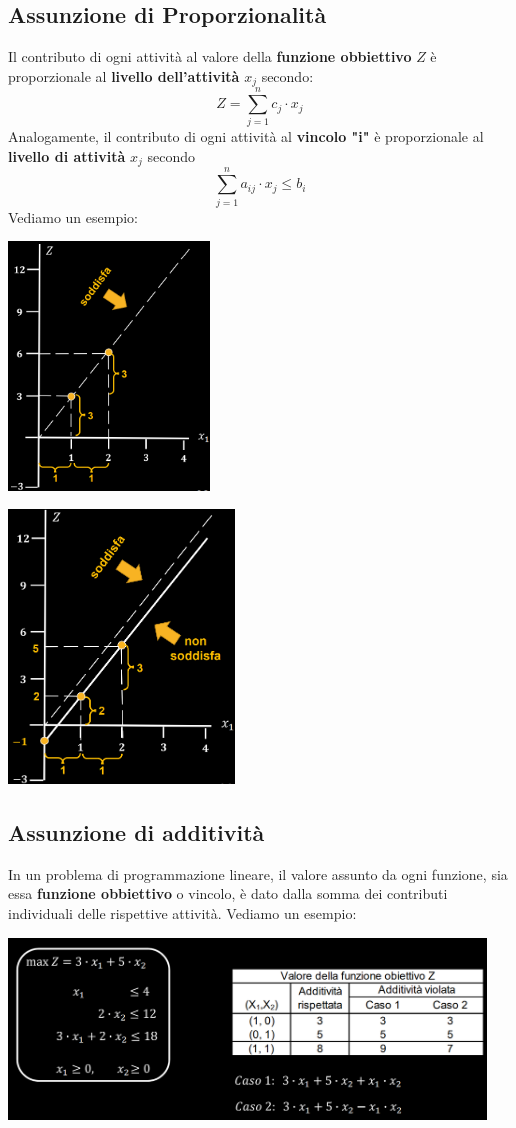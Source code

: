 \documentclass[12pt]{article}
\begin{document}
\subsection{Assunzione di Proporzionalità}
Il contributo di ogni attività al valore della \textbf{funzione obbiettivo} $Z$ è proporzionale al \textbf{livello dell'attività} $x_j$ secondo:
$$Z = \sum_{j=1}^n c_j \cdot x_j$$
Analogamente, il contributo di ogni attività al \textbf{vincolo "i"} è proporzionale al \textbf{livello di attività} $x_j$ secondo
$$\sum_{j=1}^n a_{ij} \cdot x_j \leq b_i$$
Vediamo un esempio:
\begin{center}
    \includegraphics[width = 0.40\textwidth]{Images/7.PNG}
\end{center}
\begin{center}
    \includegraphics[width = 0.45\textwidth]{Images/8.PNG}
\end{center}
\subsection{Assunzione di additività}
In un problema di programmazione lineare, il valore assunto da ogni funzione, sia essa \textbf{funzione obbiettivo} o vincolo, è dato dalla somma dei contributi individuali delle rispettive attività.
Vediamo un esempio:
\begin{center}
    \includegraphics[width = 0.95\textwidth]{Images/9.PNG}
\end{center}
\end{document}
